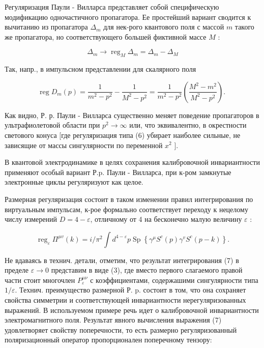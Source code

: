 \documentclass[10pt]{article}
\begin{document}
Регуляризация Паули - Вилларса представляет собой специфическую модификацию одночастичного пропагатора. Ее простейший вариант сводится к вычитанию из пропагатора $\Delta_{m}$ для нек-рого квантового поля с массой $m$ такого же пропагатора, но соответствующего большей фиктивной массе $M$ :



\[

\Delta_{m} \rightarrow \operatorname{reg}_{M} \Delta_{m}=\Delta_{m}-\Delta_{M}

\]



Так, напр., в импульсном представлении для скалярного поля



\[

\operatorname{reg} D_{m}(p)=\frac{1}{m^{2}-p^{2}}-\frac{1}{M^{2}-p^{2}}=\frac{1}{m^{2}-p^{2}}\left(\frac{M^{2}-m^{2}}{M^{2}-p^{2}}\right) \text {. }

\]



Как видно, Р. р. Паули - Вилларса существенно меняет поведение пропагаторов в ультрафиолетовой области при $p^{2} \rightarrow \infty$ или, что эквивалентно, в окрестности светового конуса [где регуляризация типа (6) убирает наиболее сильные, не зависящие от массы сингулярности по переменной $x^{2}$ ].



В квантовой электродинамике в целях сохранения калибровочной инвариантности применяют особый вариант Р.p. Паули - Вилларса, при к-ром замкнутые электронные циклы регуляризуют как целое.



Размерная регуляризация состоит в таком изменении правил интегрирования по виртуальным импульсам, к-рое формально соответствует переходу к нецелому числу измерений $D=4-\varepsilon$, отличному от 4 на бесконечно малую величину $\varepsilon$ :



\[

\operatorname{reg}_{\varepsilon} \Pi^{\mu v}(k)=i / \pi^{2} \int d^{4-\varepsilon} p \operatorname{Sp}\left\{\gamma^{\mu} S^{c}(p) \gamma^{v} S^{c}(p-k)\right\} .

\]



Не вдаваясь в технич. детали, отметим, что результат интегрирования (7) в пределе $\varepsilon \rightarrow 0$ представим в виде (3), где вместо первого слагаемого правой части стоит многочлен $P_{\varepsilon}^{\mu \nu}$ с коэффициентами, содержашими сингулярности типа $1 / \varepsilon$. Технич. преимущество размерной Р. p. состоит в том, что она сохраняет свойства симметрии и соответствующей инвариантности нерегуляризованных выражений. В используемом примере речь идет о калибровочной инвариантности электромагнитного поля. Результат явного вычисления выражения (7) удовлетворяет свойству поперечности, то есть размерно регуляризованный поляризационный оператор пропорционален поперечному тензору:
\end{document}
